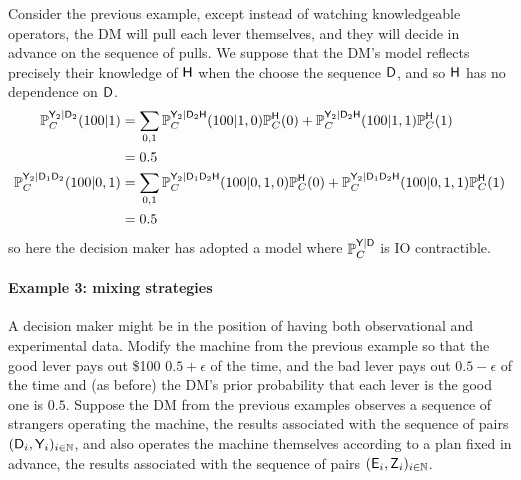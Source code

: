 Consider the previous example, except instead of watching knowledgeable operators, the DM will pull each lever themselves, and they will decide in advance on the sequence of pulls. We suppose that the DM's model reflects precisely their knowledge of $\mathsf{H}$ when the choose the sequence $\mathsf{D}$, and so $\mathsf{H}$ has no dependence on $\mathsf{D}$.
\begin{align}
        \mathbb{P}_C^{\mathsf{Y}_2|\mathsf{D}_2}(100|1) &= \sum_{0,1} \mathbb{P}_C^{\mathsf{Y}_2|\mathsf{D}_2\mathsf{H}}(100|1,0)\mathbb{P}_C^{\mathsf{H}}(0) + \mathbb{P}_C^{\mathsf{Y}_2|\mathsf{D}_2\mathsf{H}}(100|1,1)\mathbb{P}_C^{\mathsf{H}}(1)\\
        &= 0.5\\
        \mathbb{P}_C^{\mathsf{Y}_2|\mathsf{D}_1\mathsf{D}_2}(100|0,1) &= \sum_{0,1} \mathbb{P}_C^{\mathsf{Y}_2|\mathsf{D}_1\mathsf{D}_2\mathsf{H}}(100|0,1,0)\mathbb{P}_C^{\mathsf{H}}(0) + \mathbb{P}_C^{\mathsf{Y}_2|\mathsf{D}_1\mathsf{D}_2\mathsf{H}}(100|0,1,1)\mathbb{P}_C^{\mathsf{H}}(1)\\
        &= 0.5
\end{align}
so here the decision maker has adopted a model where $\mathbb{P}_C^{\mathsf{Y}|\mathsf{D}}$ is IO contractible.

\paragraph{Example 3: mixing strategies}\label{pgph:two_kinds}

A decision maker might be in the position of having both observational and experimental data. Modify the machine from the previous example so that the good lever pays out \$100 $0.5+\epsilon$ of the time, and the bad lever pays out $0.5-\epsilon$ of the time and (as before) the DM's prior probability that each lever is the good one is $0.5$. Suppose the DM from the previous examples observes a sequence of strangers operating the machine, the results associated with the sequence of pairs $(\mathsf{D}_i,\mathsf{Y}_i)_{i\in\mathbb{N}}$, and also operates the machine themselves according to a plan fixed in advance, the results associated with the sequence of pairs $(\mathsf{E}_i,\mathsf{Z}_i)_{i\in \mathbb{N}}$. 

